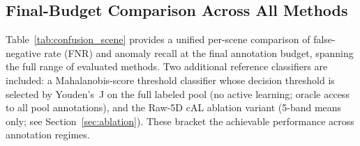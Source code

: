 \documentclass[lettersize,journal]{IEEEtran}
\begin{document}
\subsection{Final-Budget Comparison Across All Methods}

Table~\ref{tab:confusion_scene} provides a unified per-scene comparison of
false-negative rate (FNR) and anomaly recall at the final annotation budget,
spanning the full range of evaluated methods. Two additional reference
classifiers are included: a Mahalanobis-score threshold classifier whose
decision threshold is selected by Youden's~J on the full labeled pool (no
active learning; oracle access to all pool annotations), and the Raw-5D cAL
ablation variant (5-band means only; see Section~\ref{sec:ablation}).
These bracket the achievable performance across annotation regimes.
\end{document}
